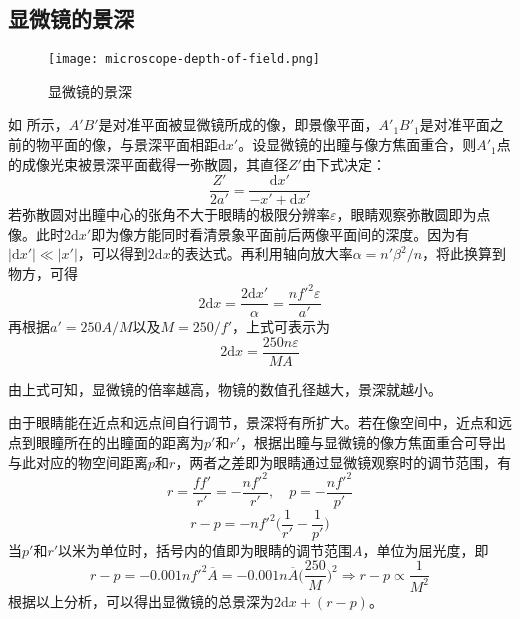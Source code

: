 \documentclass[cn,10pt,chinesefont=founder,math=mtpro2,cite=super,toc=onecol,twoside,openany]{elegantbook}
\begin{document}
\subsection{显微镜的景深}

\begin{figure}[htbp]
	\centering
	\texttt{[image: microscope-depth-of-field.png]}
	\caption{显微镜的景深}
	\label{fig:microscope-depth-of-field}
\end{figure}

如 所示，$A'B'$是对准平面被显微镜所成的像，即景像平面，$A'_1B'_1$是对准平面之前的物平面的像，与景深平面相距$\mathrm{d}x'$。设显微镜的出瞳与像方焦面重合，则$A'_1$点的成像光束被景深平面截得一弥散圆，其直径$Z'$由下式决定：
\begin{equation}
\frac{Z'}{2a'}=\frac{\mathrm{d}x'}{-x'+\mathrm{d}x'}
\end{equation}
若弥散圆对出瞳中心的张角不大于眼睛的极限分辨率$\varepsilon$，眼睛观察弥散圆即为点像。此时$2\mathrm{d}x'$即为像方能同时看清景象平面前后两像平面间的深度。因为有$|\mathrm{d}x'|\ll|x'|$，可以得到$2\mathrm{d}x$的表达式。再利用轴向放大率$\alpha=n'\beta^2/n$，将此换算到物方，可得
\begin{equation}
2\mathrm{d}x=\frac{2\mathrm{d}x'}{\alpha}=\frac{nf'^2\varepsilon}{a'}
\end{equation}
再根据$a'=250A/M$以及$M=250/f'$，上式可表示为
\begin{equation}
2\mathrm{d}x=\frac{250n\varepsilon}{MA}
\end{equation}
\begin{property}
由上式可知，显微镜的倍率越高，物镜的数值孔径越大，景深就越小。
\end{property}

由于眼睛能在近点和远点间自行调节，景深将有所扩大。若在像空间中，近点和远点到眼瞳所在的出瞳面的距离为$p'$和$r'$，根据出瞳与显微镜的像方焦面重合可导出与此对应的物空间距离$p$和$r$，两者之差即为眼睛通过显微镜观察时的调节范围，有
\begin{equation}
r=\frac{ff'}{r'}=-\frac{nf'^2}{r'},\quad p=-\frac{nf'^2}{p'}
\end{equation}
\begin{equation}
r-p=-nf'^2\bigg(\frac{1}{r'}-\frac{1}{p'}\bigg)
\end{equation}
当$p'$和$r'$以米为单位时，括号内的值即为眼睛的调节范围$A$，单位为屈光度，即
\begin{equation}
r-p=-0.001nf'^2\overline{A}=-0.001n\overline{A}\bigg(\frac{250}{M}\bigg)^2\Rightarrow r-p\propto\frac{1}{M^2}
\end{equation}
根据以上分析，可以得出显微镜的总景深为$2\mathrm{d}x+(r-p)$。
\end{document}

